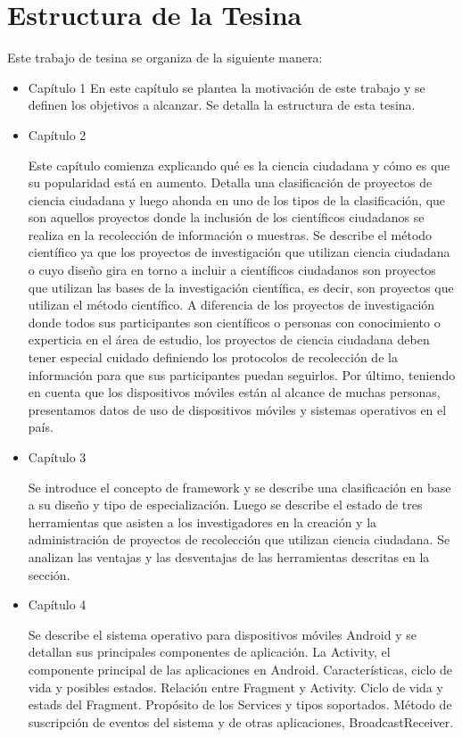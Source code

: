 \section{ Estructura de la Tesina }
Este trabajo de tesina se organiza de la siguiente manera:
\begin{itemize} 
	\item{Capítulo 1} 
		 En este capítulo se plantea la motivación de este trabajo y se definen los objetivos a alcanzar. Se detalla la estructura de esta tesina.

	\item{Capítulo 2} 
		
		Este capítulo comienza explicando qué es la ciencia ciudadana y cómo es que su popularidad está en aumento. Detalla una clasificación de proyectos de ciencia ciudadana y luego ahonda en uno de los tipos de la clasificación, que son aquellos proyectos donde la inclusión de los científicos ciudadanos se realiza en la recolección de información o muestras. Se describe el método científico ya que los proyectos de investigación que utilizan ciencia ciudadana o cuyo diseño gira en torno a incluir a científicos ciudadanos son proyectos que utilizan las bases de la investigación científica, es decir, son proyectos que utilizan el método científico. A diferencia de los proyectos de investigación donde todos sus participantes son científicos o personas con conocimiento o experticia en el área de estudio, los proyectos de ciencia ciudadana deben tener especial cuidado definiendo los protocolos de recolección de la información para que sus participantes puedan seguirlos. Por último, teniendo en cuenta que los dispositivos móviles están al alcance de muchas personas, presentamos datos de uso de dispositivos móviles y sistemas operativos en el país.
		
	
	\item{Capítulo 3} 
		
		Se introduce el concepto de framework y se describe una clasificación en base a su diseño y tipo de especialización. Luego se describe el estado de tres herramientas que asisten a los investigadores en la creación y la administración de proyectos de recolección que utilizan ciencia ciudadana. Se analizan las ventajas y las desventajas de las herramientas descritas en la sección.
		
	
	\item{Capítulo 4} 
		
		Se describe el sistema operativo para dispositivos móviles Android y se detallan sus principales componentes de aplicación. La Activity, el componente principal de las aplicaciones en Android. Características, ciclo de vida y posibles estados. Relación entre Fragment y Activity. Ciclo de vida y estads del Fragment. Propósito de los Services y tipos soportados. Método de suscripción de eventos del sistema y de otras aplicaciones, BroadcastReceiver. 
		 


\end{itemize}
